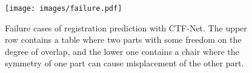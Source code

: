 \begin{figure}[!t]
  \centering
  \texttt{[image: images/failure.pdf]}
  \caption{Failure cases of registration prediction with CTF-Net. The upper row contains a table where two parts with some freedom on the degree of overlap, and the lower one contains a chair where the symmetry of one part can cause misplacement of the other part.}
  \label{fig:faliure}
\end{figure}
